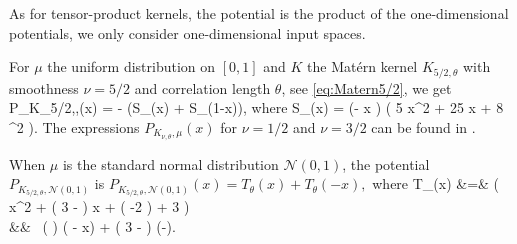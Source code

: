 As for tensor-product kernels, the potential is the product of the one-dimensional potentials, we only consider one-dimensional input spaces.

For $\mu$ the uniform distribution on $[0,1]$ and $K$ the Matérn kernel $K_{5/2,\theta}$ with smoothness $\nu=5/2$ and correlation length $\theta$, see \eqref{eq:Matern5/2}, we get
\bea
    P_{K_{5/2,\theta},\mu}(x) =  -  (S_\theta(x) + S_\theta(1-x)),
\eea
where
\bea
\nonumber
    S_\theta(x) = 
    \exp\left(-  x \right) 
    \left( 5  x^2 + 25 \theta x + 8  \theta^2 \right).
\eea
The expressions $P_{K_{\nu,\theta},\mu}(x)$ for $\nu=1/2$ and $\nu=3/2$ can be found in \cite{prozhi20}. 

When $\mu$ is the standard normal distribution $\mathcal{N}(0,1)$, the potential $P_{K_{5/2,\theta},\mathcal{N}(0,1)}$ is 
$    P_{K_{5/2,\theta},\mathcal{N}(0,1)}(x) = T_\theta(x) + T_\theta(-x),
$
where
\bea
T_\theta(x) &=&
    \left( 
         x^2 + 
        \left( 3 -  \right)  x +  \left(  -2 \right) + 3
    \right) \\
    && \times\,  \left(  \right)
    \exp\left( - x\right) +   
    \left( 3 -  \right) \exp\left(-\right). 
\eea
